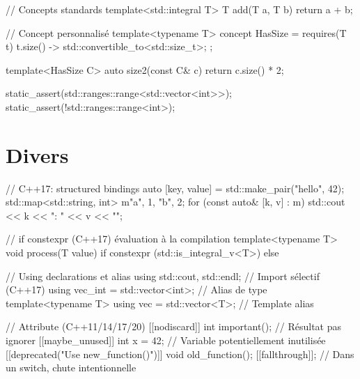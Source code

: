 \documentclass{article}
\begin{document}
\begin{multicols*}{4}
\begin{cppcode}
// Concepts standards
template<std::integral T>
T add(T a, T b) { return a + b; }

// Concept personnalisé
template<typename T>
concept HasSize = requires(T t) {
    { t.size() } -> std::convertible_to<std::size_t>;
};

template<HasSize C>
auto size2(const C& c) { return c.size() * 2; }

static_assert(std::ranges::range<std::vector<int>>);
static_assert(!std::ranges::range<int>);
\end{cppcode}

\section*{Divers}

\begin{cppcode}
// C++17: structured bindings
auto [key, value] = std::make_pair("hello", 42);
std::map<std::string, int> m{{"a", 1}, {"b", 2}};
for (const auto& [k, v] : m) {
    std::cout << k << ": " << v << "\n";
}

// if constexpr (C++17) évaluation à la compilation
template<typename T>
void process(T value) {
    if constexpr (std::is_integral_v<T>) {} else {} }

// Using declarations et alias
using std::cout, std::endl; // Import sélectif (C++17)
using vec_int = std::vector<int>; // Alias de type
template<typename T>
using vec = std::vector<T>; // Template alias

// Attribute (C++11/14/17/20)
[[nodiscard]] int important(); // Résultat pas ignorer
[[maybe_unused]] int x = 42;   // Variable potentiellement inutilisée
[[deprecated("Use new_function()")]] void old_function();
[[fallthrough]]; // Dans un switch, chute intentionnelle
\end{cppcode}





\end{multicols*}
\end{document}
